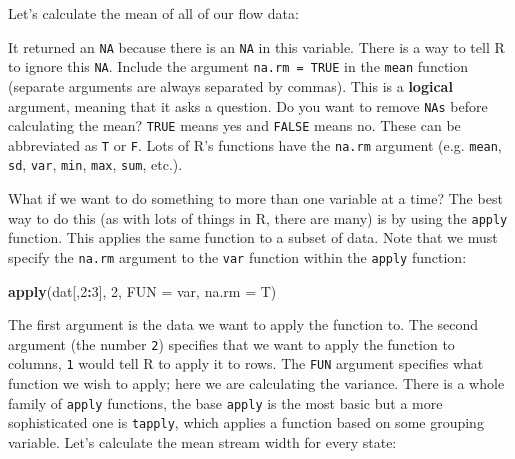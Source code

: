 \documentclass[]{book}
\newenvironment{Shaded}{\begin{snugshade}}{\end{snugshade}}
\newcommand{\KeywordTok}[1]{\textcolor[rgb]{0.13,0.29,0.53}{\textbf{#1}}}
\newcommand{\DataTypeTok}[1]{\textcolor[rgb]{0.13,0.29,0.53}{#1}}
\newcommand{\DecValTok}[1]{\textcolor[rgb]{0.00,0.00,0.81}{#1}}
\newcommand{\OperatorTok}[1]{\textcolor[rgb]{0.81,0.36,0.00}{\textbf{#1}}}
\newcommand{\NormalTok}[1]{#1}
\theoremstyle{definition}
\theoremstyle{definition}
\theoremstyle{definition}
\theoremstyle{remark}
\begin{document}
Let's calculate the mean of all of our flow data:

\begin{Shaded}
\end{Shaded}

It returned an \texttt{NA} because there is an \texttt{NA} in this
variable. There is a way to tell R to ignore this \texttt{NA}. Include
the argument \texttt{na.rm\ =\ TRUE} in the \texttt{mean} function
(separate arguments are always separated by commas). This is a
\textbf{logical} argument, meaning that it asks a question. Do you want
to remove \texttt{NAs} before calculating the mean? \texttt{TRUE} means
yes and \texttt{FALSE} means no. These can be abbreviated as \texttt{T}
or \texttt{F}. Lots of R's functions have the \texttt{na.rm} argument
(e.g. \texttt{mean}, \texttt{sd}, \texttt{var}, \texttt{min},
\texttt{max}, \texttt{sum}, etc.).

\begin{Shaded}
\end{Shaded}

What if we want to do something to more than one variable at a time? The
best way to do this (as with lots of things in R, there are many) is by
using the \texttt{apply} function. This applies the same function to a
subset of data. Note that we must specify the \texttt{na.rm} argument to
the \texttt{var} function within the \texttt{apply} function:

\begin{Shaded}
\begin{Highlighting}[]
\KeywordTok{apply}\NormalTok{(dat[,}\DecValTok{2}\OperatorTok{:}\DecValTok{3}\NormalTok{], }\DecValTok{2}\NormalTok{, }\DataTypeTok{FUN =}\NormalTok{ var, }\DataTypeTok{na.rm =}\NormalTok{ T)}
\end{Highlighting}
\end{Shaded}

The first argument is the data we want to apply the function to. The
second argument (the number \texttt{2}) specifies that we want to apply
the function to columns, \texttt{1} would tell R to apply it to rows.
The \texttt{FUN} argument specifies what function we wish to apply; here
we are calculating the variance. There is a whole family of
\texttt{apply} functions, the base \texttt{apply} is the most basic but
a more sophisticated one is \texttt{tapply}, which applies a function
based on some grouping variable. Let's calculate the mean stream width
for every state:
\end{document}
